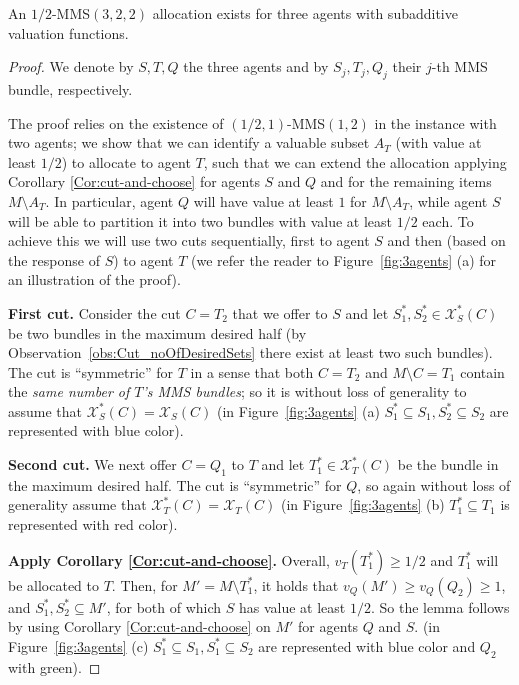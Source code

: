 \begin{lemma} 
\label{Lemma:threehalfs}
    An $1/2$-MMS$(3,2,2)$ allocation exists for three agents with subadditive valuation functions.
\end{lemma}
\begin{proof}
We denote by $S,T,Q$ the three agents and by $S_j,T_j,Q_j$ their $j$-th MMS bundle, respectively. 

The proof relies on the existence of $(1/2,1)$-MMS$(1,2)$ in the instance with two agents; we show that we can identify a valuable subset $A_T$ (with value at least $1/2$) to allocate to agent $T$, such that we can extend the allocation applying Corollary \ref{Cor:cut-and-choose} for agents $S$ and $Q$ and for the remaining items $M\setminus A_T$. In particular, agent $Q$ will have value at least $1$ for $M\setminus A_T$, while agent $S$ will be able to partition it into two bundles with value at least $1/2$ each. To achieve this we will use two cuts sequentially, first to agent $S$ and then (based on the response of $S$) to agent $T$  (we refer the reader to Figure~\ref{fig:3agents} (a) for an illustration of the proof).
    
{\bf First cut.} Consider the cut $C=T_2$ that we offer to $S$ and let $S_1^*,S_2^* \in \mathcal{X}_{S}^*(C)$ be two bundles in the maximum desired half (by Observation~\ref{obs:Cut_noOfDesiredSets} there exist at least two such bundles). The cut is ``symmetric'' for $T$ in a sense that both $C=T_2$ and $M\setminus C=T_1$ contain the {\em same number of $T$'s MMS bundles}; so it is without loss of generality to assume that $\mathcal{X}^*_S(C)=\mathcal{X}_S(C)$ (in Figure~\ref{fig:3agents} (a) $S_1^* \subseteq S_1,S_2^* \subseteq S_2$ are represented with blue color).

{\bf Second cut.} We next offer $C=Q_1$ to $T$ and let  $T_1^* \in \mathcal{X}_T^*(C)$ be the bundle in the maximum desired half. The cut is ``symmetric'' for $Q$, so again without loss of generality assume that $\mathcal{X}_T^*(C)=\mathcal{X}_T(C)$ (in Figure~\ref{fig:3agents} (b) $T_1^* \subseteq T_1$ is represented with red color).

    
{\bf Apply Corollary \ref{Cor:cut-and-choose}.} Overall, $v_T(T^*_1)\geq 1/2$ and $T^*_1$ will be allocated to $T$. Then, for $M'=M\setminus T^*_1$, it holds that $v_Q(M')\geq v_Q(Q_2) \geq 1$, and $S_1^*,S_2^*\subseteq M'$, for both of which $S$ has value at least $1/2$. So the lemma follows by using Corollary \ref{Cor:cut-and-choose} on $M'$ for agents $Q$ and $S$. (in Figure~\ref{fig:3agents} (c) $S_1^* \subseteq S_1,S_1^* \subseteq S_2$ are represented with blue color and $Q_2$ with green).
\end{proof}
